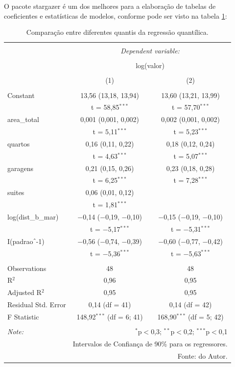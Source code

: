 \documentclass[
	12pt,				%
	oneside,			%
	a4paper,			%
	chapter=TITLE,		%
	section=TITLE,		%
	english,			%
	brazil				%
	]{abntex2}
\newcommand{\pkg}[1]{{\normalfont\fontseries{b}\selectfont #1}}
\begin{document}
O pacote \pkg{stargazer} \autocite*{R-stargazer} é um dos melhores para a elaboração de tabelas de
coeficientes e estatísticas de modelos, conforme pode ser visto na tabela
\ref{tab:fits}:
\begin{table}[!htbp] \centering 
  \caption{Comparação entre diferentes quantis da regressão quantílica.} 
  \label{tab:fits} 
\begin{tabular}{@{\extracolsep{5pt}}lcc} 
\\[-1.8ex]\hline 
\hline \\[-1.8ex] 
 & \multicolumn{2}{c}{\textit{Dependent variable:}} \\ 
\cline{2-3} 
\\[-1.8ex] & \multicolumn{2}{c}{log(valor)} \\ 
\\[-1.8ex] & (1) & (2)\\ 
\hline \\[-1.8ex] 
 Constant & 13,56 (13,18, 13,94) & 13,60 (13,21, 13,99) \\ 
  & t = 58,85$^{***}$ & t = 57,70$^{***}$ \\ 
  area\_total & 0,001 (0,001, 0,002) & 0,002 (0,001, 0,002) \\ 
  & t = 5,11$^{***}$ & t = 5,23$^{***}$ \\ 
  quartos & 0,16 (0,11, 0,22) & 0,18 (0,12, 0,24) \\ 
  & t = 4,63$^{***}$ & t = 5,07$^{***}$ \\ 
  garagens & 0,21 (0,15, 0,26) & 0,23 (0,18, 0,28) \\ 
  & t = 6,25$^{***}$ & t = 7,28$^{***}$ \\ 
  suites & 0,06 (0,01, 0,12) &  \\ 
  & t = 1,81$^{***}$ &  \\ 
  log(dist\_b\_mar) & $-$0,14 ($-$0,19, $-$0,10) & $-$0,15 ($-$0,19, $-$0,10) \\ 
  & t = $-$5,17$^{***}$ & t = $-$5,31$^{***}$ \\ 
  I(padrao$\hat{\mkern6mu}$-1) & $-$0,56 ($-$0,74, $-$0,39) & $-$0,60 ($-$0,77, $-$0,42) \\ 
  & t = $-$5,36$^{***}$ & t = $-$5,63$^{***}$ \\ 
 \hline \\[-1.8ex] 
Observations & 48 & 48 \\ 
R$^{2}$ & 0,96 & 0,95 \\ 
Adjusted R$^{2}$ & 0,95 & 0,95 \\ 
Residual Std. Error & 0,14 (df = 41) & 0,14 (df = 42) \\ 
F Statistic & 148,92$^{***}$ (df = 6; 41) & 168,90$^{***}$ (df = 5; 42) \\ 
\hline 
\hline \\[-1.8ex] 
\textit{Note:}  & \multicolumn{2}{r}{$^{*}$p$<$0,3; $^{**}$p$<$0,2; $^{***}$p$<$0,1} \\ 
 & \multicolumn{2}{r}{Intervalos de Confiança de 90\% para os regressores.} \\ 
 & \multicolumn{2}{r}{Fonte: do Autor.} \\ 
\end{tabular} 
\end{table}
\end{document}
